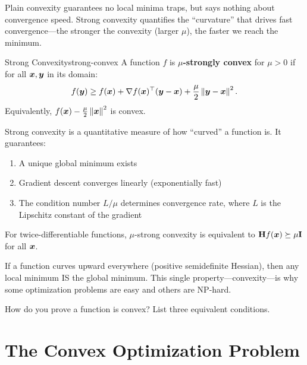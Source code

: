 \documentclass[../../main.tex]{subfiles}
\begin{document}
Plain convexity guarantees no local minima traps, but says nothing about convergence speed. Strong convexity quantifies the ``curvature'' that drives fast convergence---the stronger the convexity (larger $\mu$), the faster we reach the minimum.

\begin{definition}{Strong Convexity}{strong-convex}
A function $f$ is \textbf{$\mu$-strongly convex} for $\mu > 0$ if for all $\boldsymbol{x}, \boldsymbol{y}$ in its domain:
\[
    f(\boldsymbol{y}) \geq f(\boldsymbol{x}) + \nabla f(\boldsymbol{x})^\top (\boldsymbol{y} - \boldsymbol{x}) + \frac{\mu}{2} \left\lVert \boldsymbol{y} - \boldsymbol{x} \right\rVert^2.
\]
Equivalently, $f(\boldsymbol{x}) - \frac{\mu}{2}\left\lVert \boldsymbol{x} \right\rVert^2$ is convex.
\end{definition}

\begin{keyconcept}
Strong convexity is a quantitative measure of how ``curved'' a function is. It guarantees:
\begin{enumerate}
    \item A unique global minimum exists
    \item Gradient descent converges linearly (exponentially fast)
    \item The condition number $L/\mu$ determines convergence rate, where $L$ is the Lipschitz constant of the gradient
\end{enumerate}
\end{keyconcept}

For twice-differentiable functions, $\mu$-strong convexity is equivalent to $\mathbf{H} f(\boldsymbol{x}) \succeq \mu \mathbf{I}$ for all $\boldsymbol{x}$.

\begin{aha}
If a function curves upward everywhere (positive semidefinite Hessian), then any local minimum IS the global minimum. This single property---convexity---is why some optimization problems are easy and others are NP-hard.
\end{aha}

\begin{checkpoint}
How do you prove a function is convex? List three equivalent conditions.
\end{checkpoint}

\section{The Convex Optimization Problem}
\label{sec:convex-opt-problem}
\end{document}
